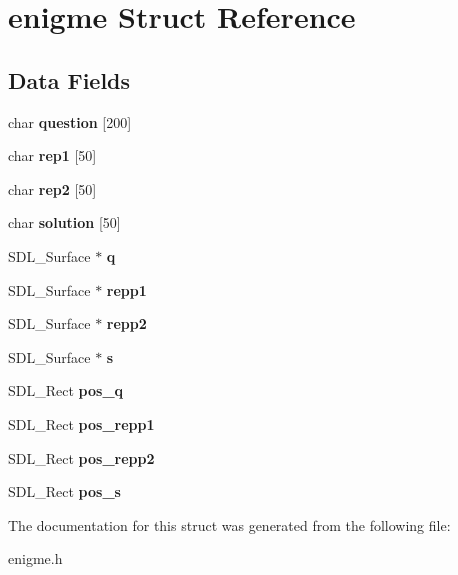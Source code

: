 \hypertarget{structenigme}{}\section{enigme Struct Reference}
\label{structenigme}
\subsection*{Data Fields}
\begin{DoxyCompactItemize}
\item 
\mbox{\label{structenigme_a13c263b6a2a06090e3b87ca725152ffb}} 
char {\bfseries question} \mbox{[}200\mbox{]}
\item 
\mbox{\label{structenigme_abbf793dd786fc6749edbebe13eb8cc93}} 
char {\bfseries rep1} \mbox{[}50\mbox{]}
\item 
\mbox{\label{structenigme_a546951153ffaaff07718c449b8672b7d}} 
char {\bfseries rep2} \mbox{[}50\mbox{]}
\item 
\mbox{\label{structenigme_a1d8e5ca92fc206522d8da77dd209b49f}} 
char {\bfseries solution} \mbox{[}50\mbox{]}
\item 
\mbox{\label{structenigme_a45139d48008c7103de10ceb18b0f497c}} 
S\+D\+L\+\_\+\+Surface $\ast$ {\bfseries q}
\item 
\mbox{\label{structenigme_a604b74f5f5bc7565adcc722c72cc6253}} 
S\+D\+L\+\_\+\+Surface $\ast$ {\bfseries repp1}
\item 
\mbox{\label{structenigme_abb4d0339bc35a3dac8ac8638bbb47f8e}} 
S\+D\+L\+\_\+\+Surface $\ast$ {\bfseries repp2}
\item 
\mbox{\label{structenigme_aef10c480af692d591c246db74263a8fc}} 
S\+D\+L\+\_\+\+Surface $\ast$ {\bfseries s}
\item 
\mbox{\label{structenigme_a31427c748000866eb93887972a49cadd}} 
S\+D\+L\+\_\+\+Rect {\bfseries pos\+\_\+q}
\item 
\mbox{\label{structenigme_acd8203e214ebc77954102de102f1c9a3}} 
S\+D\+L\+\_\+\+Rect {\bfseries pos\+\_\+repp1}
\item 
\mbox{\label{structenigme_a71c31bf602fdbdc64936e7495f3b55b0}} 
S\+D\+L\+\_\+\+Rect {\bfseries pos\+\_\+repp2}
\item 
\mbox{\label{structenigme_a64a722918563b8ce6be8b83918400bd1}} 
S\+D\+L\+\_\+\+Rect {\bfseries pos\+\_\+s}
\end{DoxyCompactItemize}


The documentation for this struct was generated from the following file\+:\begin{DoxyCompactItemize}
\item 
enigme.\+h\end{DoxyCompactItemize}

